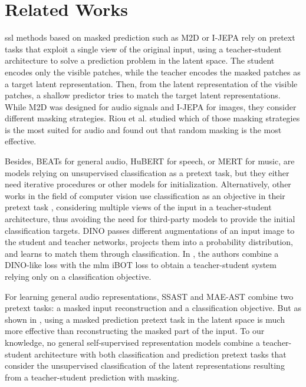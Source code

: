 \section{Related Works}
\ac{ssl} methods based on masked prediction such as M2D \cite{niizumi23m2d} or I-JEPA \cite{assran23ijepa} rely on pretext tasks that exploit a single view of the original input, using a teacher-student architecture to solve a prediction problem in the latent space. 
The student encodes only the visible patches, while the teacher encodes the masked patches as a target latent representation. 
Then, from the latent representation of the visible patches, a shallow predictor tries to match the target latent representations.
While M2D was designed for audio signals and I-JEPA for images, they consider different masking strategies. 
Riou et al. \cite{riou24jepa} studied which of those masking strategies is the most suited for audio and found out that random masking is the most effective.

Besides, BEATs \cite{chen23beats} for general audio, HuBERT \cite{Hsu21HUBERT} for speech, or MERT \cite{Li24mert} for music, are models relying on unsupervised classification as a pretext task, but they either need iterative procedures or other models for initialization. 
Alternatively, other works in the field of computer vision use classification as an objective in their pretext task \cite{Caron21dino, Zhou22ibot, OquabA24dinov2}, considering multiple views of the input in a teacher-student architecture, thus avoiding the need for third-party models to provide the initial classification targets.
DINO \cite{Caron21dino} passes different augmentations of an input image to the student and teacher networks, projects them into a probability distribution, and learns to match them through classification.
In \cite{OquabA24dinov2}, the authors combine a DINO-like loss with the \ac{mlm} iBOT \cite{Zhou22ibot} loss to obtain a teacher-student system relying only on a classification objective. 

For learning general audio representations, SSAST \cite{Gong22ssast} and MAE-AST \cite{Baade22maeast} combine two pretext tasks: a masked input reconstruction and a classification objective. 
But as shown in \cite{niizumi23m2d}, using a masked prediction pretext task in the latent space is much more effective than reconstructing the masked part of the input. To our knowledge, no general self-supervised representation models combine a teacher-student architecture with both classification and prediction pretext tasks that consider the unsupervised classification of the latent representations resulting from a teacher-student prediction with masking.


